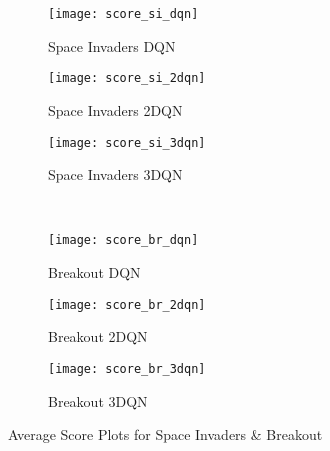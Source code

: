 \begin{figure}[H]
	\centering
	\begin{subfigure}{.3\textwidth}
		\centering
		\texttt{[image: score\_si\_dqn]}
		\caption{Space Invaders DQN}
		\label{subfig:score_si_dqn}
	\end{subfigure}%
	\begin{subfigure}{.3\textwidth}
		\centering
		\texttt{[image: score\_si\_2dqn]}
		\caption{Space Invaders 2DQN}
		\label{subfig:score_si_2dqn}
	\end{subfigure}%
	\begin{subfigure}{.3\textwidth}
		\centering
		\texttt{[image: score\_si\_3dqn]}
		\caption{Space Invaders 3DQN}
		\label{subfig:score_si_3dqn}
	\end{subfigure}%
	\\
	\begin{subfigure}{.3\textwidth}
		\centering
		\texttt{[image: score\_br\_dqn]}
		\caption{Breakout DQN}
		\label{subfig:score_br_dqn}
	\end{subfigure}%
	\begin{subfigure}{.3\textwidth}
		\centering
		\texttt{[image: score\_br\_2dqn]}
		\caption{Breakout 2DQN}
		\label{subfig:score_br_2dqn}
	\end{subfigure}%
	\begin{subfigure}{.3\textwidth}
		\centering
		\texttt{[image: score\_br\_3dqn]}
		\caption{Breakout 3DQN}
		\label{subfig:score_br_3dqn}
	\end{subfigure}
	\caption{Average Score Plots for Space Invaders \& Breakout}
	\label{fig:score_plots}
\end{figure}

